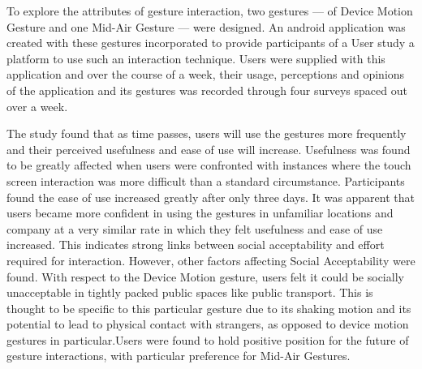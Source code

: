 \documentclass{l4proj}
\begin{document}
To explore the attributes of gesture interaction, two gestures --- of Device Motion Gesture and one Mid-Air Gesture --- were designed. An android application was created with these gestures incorporated to provide participants of a User study a platform to use such an interaction technique. Users were supplied with this application and over the course of a week, their usage, perceptions and opinions of the application and its gestures was recorded through four surveys spaced out over a week.

The study found that as time passes, users will use the gestures more frequently and their perceived usefulness and ease of use will increase. Usefulness was found to be greatly affected when users were confronted with instances where the touch screen interaction was more difficult than a standard circumstance. Participants found the ease of use increased greatly after only three days. It was apparent that users became more confident in using the gestures in unfamiliar locations and company at a very similar rate in which they felt usefulness and ease of use increased. This indicates strong links between social acceptability and effort required for interaction. However, other factors affecting Social Acceptability were found. With respect to the Device Motion gesture, users felt it could be socially unacceptable in tightly packed public spaces like public transport. This is thought to be specific to this particular gesture due to its shaking motion and its potential to lead to physical contact with strangers, as opposed to device motion gestures in particular.Users were found to hold positive position for the future of gesture interactions, with particular preference for Mid-Air Gestures. 
\end{document}
